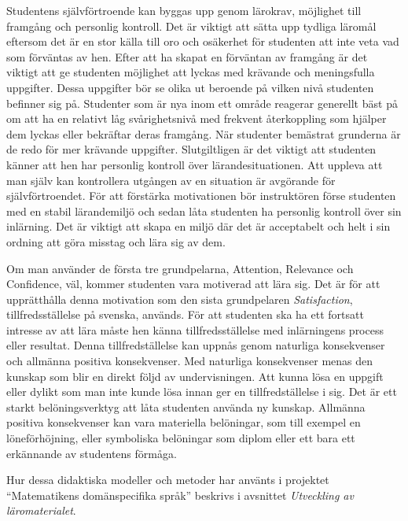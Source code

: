 \documentclass[]{article}
\begin{document}
Studentens självförtroende kan byggas upp genom lärokrav,
möjlighet till framgång och personlig kontroll.
Det är viktigt att sätta upp tydliga läromål eftersom det är en stor
källa till oro och osäkerhet för studenten att inte veta vad som
förväntas av hen. Efter att ha skapat en förväntan av framgång är det
viktigt att ge studenten möjlighet att lyckas med krävande och
meningsfulla uppgifter. Dessa uppgifter bör se olika ut beroende på
vilken nivå studenten befinner sig på. Studenter som är nya inom ett område
reagerar generellt bäst på om att ha en relativt låg svårighetsnivå med frekvent
återkoppling som hjälper dem lyckas eller bekräftar deras framgång.
När studenter bemästrat grunderna är de redo för mer krävande uppgifter.
Slutgiltligen är det viktigt att studenten känner att hen har personlig
kontroll över lärandesituationen. Att uppleva att man själv kan
kontrollera utgången av en situation är avgörande för självförtroendet.
För att förstärka motivationen bör instruktören förse studenten med en
stabil lärandemiljö och sedan låta studenten ha personlig kontroll över sin
inlärning. Det är viktigt att skapa en miljö där det är acceptabelt och helt
i sin ordning att göra misstag och lära sig av dem.

Om man använder de första tre grundpelarna, Attention, Relevance och Confidence,
väl, kommer studenten vara motiverad att lära sig.
Det är för att upprätthålla denna motivation som den sista grundpelaren
\textit{Satisfaction}, tillfredsställelse på svenska, används.
För att studenten ska ha ett fortsatt intresse av att lära måste hen känna
tillfredsställelse med inlärningens process eller resultat.
Denna tillfredställelse kan uppnås genom naturliga konsekvenser och allmänna positiva
konsekvenser. Med naturliga konsekvenser menas den kunskap som blir
en direkt följd av undervisningen. Att kunna lösa en uppgift eller dylikt
som man inte kunde lösa innan ger en tillfredställelse i sig.
Det är ett starkt belöningsverktyg att låta studenten använda ny kunskap.
Allmänna positiva konsekvenser kan vara materiella belöningar,
som till exempel en löneförhöjning, eller symboliska belöningar som diplom
eller ett bara ett erkännande av studentens förmåga.

Hur dessa didaktiska modeller och metoder har använts i projektet
``Matematikens domänspecifika språk'' beskrivs i avsnittet
\textit{Utveckling av läromaterialet}.
\end{document}
